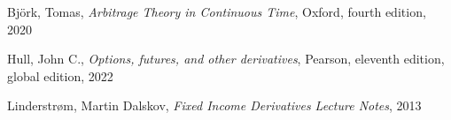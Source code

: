 \clearpage
{}

\begin{thebibliography}{25}
 Björk, Tomas,
 \emph{Arbitrage Theory in Continuous Time},
 Oxford, fourth edition, 2020

Hull, John C., 
\emph{Options, futures, and other derivatives},
Pearson, eleventh edition, global edition, 2022

Linderstrøm, Martin Dalskov, 
\emph{Fixed Income Derivatives Lecture Notes},
2013
 
\end{thebibliography}

